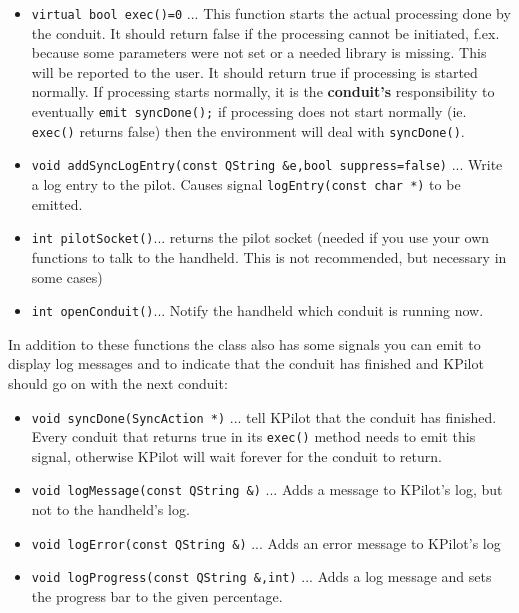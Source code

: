 \documentclass[10pt,a4paper]{article}
\newcommand{\code}[1]{{\small\texttt{#1}}}
\begin{document}
\begin{itemize}
\item
    \code{virtual bool exec()=0} ... This function starts the actual processing done
     by the conduit. It should return false if the
     processing cannot be initiated, f.ex. because 
     some parameters were not set or a needed library
     is missing. This will be reported to the user.
     It should return true if processing is started
     normally. If processing starts normally, it is
     the {\bf conduit's} responsibility to eventually
     \code{emit syncDone();} if processing does not start
     normally (ie. \code{exec()} returns false) then the
     environment will deal with \code{syncDone()}.

\item
    \code{void addSyncLogEntry(const QString \&e,bool suppress=false)} ... Write a log entry to the pilot. Causes signal \code{logEntry(const char *)} to be emitted.
\item
    \code{int pilotSocket()}\qquad ... returns the pilot socket (needed if you use your own functions to talk to the handheld. This is not recommended, but necessary in some cases)
\item
    \code{int openConduit()}\qquad ... Notify the handheld which conduit is running now.
\end{itemize}

In addition to these functions the class also has some signals you can emit to display log messages and to indicate that the conduit has finished and KPilot should go on with the next conduit:\

\begin{itemize}
\item \code{void syncDone(SyncAction *)} ... tell KPilot that the conduit has finished. Every conduit that returns true in its \code{exec()} method needs to emit this signal, otherwise KPilot will wait forever for the conduit to return.

\item \code{void logMessage(const QString \&)} ... Adds a message to KPilot's log, but not to the handheld's log.
\item \code{void logError(const QString \&)} ... Adds an error message to KPilot's log
\item \code{void logProgress(const QString \&,int)} ... Adds a log message and sets the progress bar to the given percentage.
\end{itemize}
\end{document}
